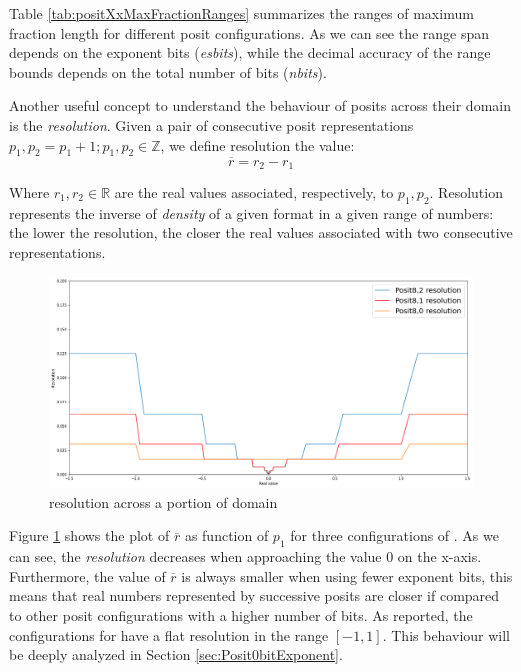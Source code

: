 Table \ref{tab:positXxMaxFractionRanges} summarizes the ranges of maximum fraction length for different posit configurations. As we can see the range span depends on the exponent bits (\textit{esbits}), while the decimal accuracy of the range bounds depends on the total number of bits (\textit{nbits}).

Another useful concept to understand the behaviour of posits across their domain is the \textit{resolution}. Given a pair of consecutive posit representations $p_1, p_2 = p_1 + 1; p_1, p_2 \in \mathbb{Z}$, we define resolution the value:
\begin{equation}\label{eqn:positResolution}
    \overline{r} = r_2 - r_1
\end{equation}

Where $r_1,r_2 \in \mathbb{R}$ are the real values associated, respectively, to $p_1, p_2$. Resolution represents the inverse of \textit{density} of a given format in a given range of numbers: the lower the resolution, the closer the real values associated with two consecutive representations.

\begin{figure}
    \centering
    \includegraphics[width=\linewidth]{img/posit8xResolutions.png}
    \caption{ resolution across a portion of domain}
    \label{fig:posit8xResolutions}
\end{figure}

Figure \ref{fig:posit8xResolutions} shows the plot of $\overline{r}$ as function of $p_1$ for three configurations of . As we can see, the \textit{resolution} decreases when approaching the value $0$ on the x-axis. Furthermore, the value of $\overline{r}$ is always smaller when using fewer exponent bits, this means that real numbers represented by successive posits are closer if compared to other posit configurations with a higher number of bits. As reported, the configurations for  have a flat resolution in the range $\left [ -1, 1 \right]$. This behaviour will be deeply analyzed in Section \ref{sec:Posit0bitExponent}.

